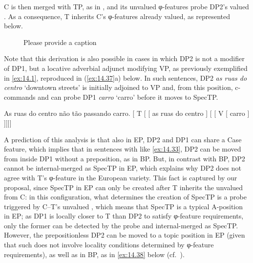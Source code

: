 \documentclass[output=paper]{langsci/langscibook}
\begin{document}
C is then merged with TP, as in , and its unvalued
φ-features probe DP2’s valued . As a consequence, T inherits C’s
φ-features already valued, as represented below.

\begin{figure}%
    \caption{\color{red}Please provide a caption\label{fig:ex:14.36}}
\end{figure}

Note that this derivation is also possible in cases in which DP2 is not a
modifier of DP1, but a locative adverbial adjunct modifying VP, as previously
exemplified in \eqref{ex:14.1}, reproduced in (\ref{ex:14.37}a) below.
In such sentences, DP2 \emph{as ruas do centro} ‘downtown streets’ is initially
adjoined to VP and, from this position, c-commands and can probe DP1
\emph{carro} ‘carro’ before it moves to SpecTP.

\ea%
    \label{ex:14.37}
	\ea     As ruas do centro não tão passando carro.
    \ex     {}[ T [ [ as ruas do centro ]
                [ [ V [ carro ] ]]]]
    \z
\z

A prediction of this analysis is that also in EP, DP2 and DP1 can share a Case
feature, which implies that in sentences with  like
\eqref{ex:14.33}, DP2 can be moved from inside DP1 without a preposition, as in
BP. But, in contrast with BP, DP2 cannot be internal-merged as SpecTP in EP,
which explains why DP2 does not agree with T’s φ-feature in the European
variety. This fact is captured by our proposal, since SpecTP in \gls{EP} can
only be created after T inherits the unvalued  from C\@: in this
configuration, what determines the creation of SpecTP is a probe triggered by
C--T’s unvalued , which means that SpecTP is a typical A-position in
\gls{EP}; as DP1 is locally closer to T than DP2 to satisfy φ-feature
requirements, only the former can be detected by the probe and internal-merged
as SpecTP\@.  However, the prepositionless DP2 can be moved to a topic position
in \gls{EP} (given that such  does not involve locality conditions
determined by φ-feature requirements), as well as in BP, as in \eqref{ex:14.38}
below (cf.\ \citealt{Costa2010,AvelarGalves2011}).
\end{document}
